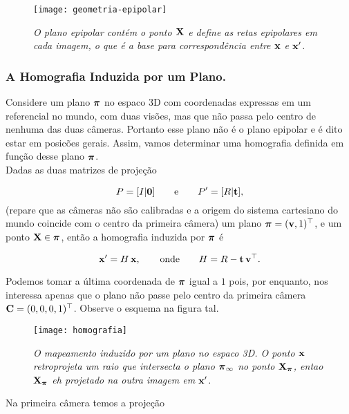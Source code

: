 \begin{figure}[!htb]
\centering
\texttt{[image: geometria-epipolar]}
\caption{\textit{O plano epipolar contém o ponto $\mathbf{X}$ e define as retas epipolares em cada imagem, o que é a base para correspondência entre $\mathbf{x}$ e $\mathbf{x}'$.}}
\label{fig.geo-epipolar}
\end{figure}

\subsubsection{A Homografia Induzida por um Plano.}\label{sec.homografia}

Considere um plano $\boldsymbol{\pi}$ no espaco 3D com coordenadas expressas em um referencial no mundo, com duas visões, mas que não passa pelo centro de nenhuma das duas câmeras. Portanto esse plano não é o plano epipolar e é dito estar em posicões gerais. Assim, vamos determinar uma homografia definida em função desse plano $\boldsymbol{\pi}$.\\

Dadas as duas matrizes de projeção 

\begin{equation*}
P=[I|{\bf 0}]\qquad\text{e}\qquad P'=[R|{\bf t}],
\end{equation*}
(repare que as câmeras não são calibradas e a origem do sistema cartesiano do mundo coincide com o centro da primeira câmera) um plano $\boldsymbol{\pi}=({\bf v},1)^\top$, e um ponto $\mathbf{X}\in\boldsymbol{\pi}$, então a homografia induzida por $\boldsymbol{\pi}$ é

\begin{equation*}
\mathbf{x}'=H\,\mathbf{x},\qquad\text{onde}\qquad H=R-{\bf t}\,{\bf v}^\top.
\end{equation*}

Podemos tomar a última coordenada de $\boldsymbol{\pi}$ igual a $1$ pois, por enquanto, nos interessa apenas que o plano não passe pelo centro da primeira câmera ${\bf C}=(0,0,0,1)^\top$. Observe o esquema na figura tal. 

\begin{figure}[!htb]
\centering
\texttt{[image: homografia]}
\caption{\textit{O mapeamento induzido por um plano no espaco 3D. O ponto $\mathbf{x}$ retroprojeta um raio que intersecta o plano $\boldsymbol{\pi}_{\infty}$ no ponto $\mathbf{X}_{\boldsymbol{\pi}}$, entao $\mathbf{X}_{\boldsymbol{\pi}}$ eh projetado na outra imagem em $\mathbf{x}'$.}}
\label{fig.homografia}
\end{figure}




Na primeira câmera temos a projeção

